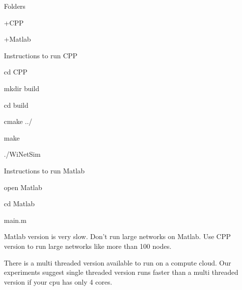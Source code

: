 Folders \par
+\-C\-P\-P \par
+\-Matlab \par


Instructions to run C\-P\-P

cd C\-P\-P \par
mkdir build \par
cd build \par
cmake ../ \par
make \par
./\-Wi\-Net\-Sim \par


Instructions to run Matlab \par
open Matlab \par
cd Matlab \par
main.\-m \par


Matlab version is very slow. Don't run large networks on Matlab. Use C\-P\-P version to run large networks like more than 100 nodes.

There is a multi threaded version available to run on a compute cloud. Our experiments suggest single threaded version runs faster than a multi threaded version if your cpu has only 4 cores. 